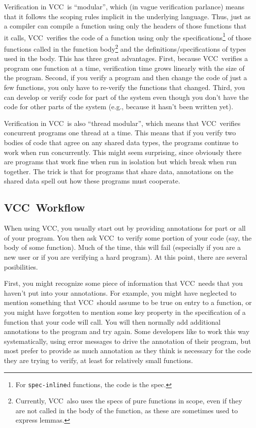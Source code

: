 \documentclass{report}
\newcommand{\Q}[1]{\lstinline~#1~}
\newcommand{\VCC}{VCC}
\begin{document}
Verification in \VCC\ is ``modular'', which (in vague verification
parlance) means that it follows the scoping rules implicit in the
underlying language. Thus, just as a compiler can compile a function
using only the headers of those functions that it calls,
\VCC\ verifies the code of a function using only the
specifications\footnote{For \Q{spec-inline}d functions, the code is the
  spec.} of those functions called in the function
body\footnote{Currently, \VCC\ also uses the specs of pure functions
  in scope, even if they are not called in the body of the function,
  as these are sometimes used to express lemmas.} and the definitions/specifications of types used in the
body. This has three great advantages. First, because \VCC\ verifies a
program one function at a time, verification time grows linearly with
the size of the program. Second, if you verify a program and then
change the code of just a few functions, you only have to re-verify
the functions that changed. Third, you can develop or verify code for
part of the system even though you don't have the code for other parts
of the system (e.g., because it hasn't been written yet).

Verification in \VCC\ is also ``thread modular'', which means that \VCC\
verifies concurrent programs one thread at a time. This means that if
you verify two bodies of code that agree on any shared data types, the
programs continue to work when run concurrently. This might seem
surprising, since obviously there are programs that work fine when run
in isolation but which break when run together. The trick is that for
programs that share data, annotations on the shared data spell out how
these programs must cooperate.

\subsection{\VCC\ Workflow}

When using \VCC, you usually start out by providing annotations for
part or all of your program. You then ask \VCC\ to verify some portion
of your code (say, the body of some function). Much of the time, this
will fail (especially if you are a new user or if you are verifying a hard
program). At this point, there are several posibilities.

First, you might recognize some piece of information
that \VCC\ needs that you haven't put into your annotations. For
example, you might have neglected to mention something that
\VCC\ should assume to be true on entry to a function, or you might
have forgotten to mention some key property in the specification of a
function that your code will call. You will then normally
add additional annotations to the program and try again. Some
developers like to work this way systematically, using error messages
to drive the annotation of their program, but most prefer to provide
as much annotation as they think is necessary for the code they are
trying to verify, at least for relatively small functions.
\end{document}
